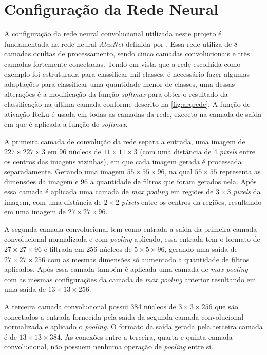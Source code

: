 


\section{Configuração da Rede Neural}

A configuração da rede neural convolucional utilizada neste projeto é fundamentada na rede neural \textit{AlexNet} definida por . Essa rede utiliza de 8 camadas ocultas de processamento, sendo cinco camadas convolucionais e três camadas fortemente conectadas. Tendo em vista que a rede escolhida como exemplo foi estruturada para classificar mil classes, é necessário fazer algumas adaptações para classificar uma quantidade menor de classes, uma dessas alterações é a modificação da função \textit{softmax} para obter o resultado da classificação na última camada conforme descrito na \autoref{fig:arqrede}. A função de ativação ReLu é usada em todas as camadas da rede, execeto na camada de saída em que é aplicada a função de \textit{softmax}.

\par A primeira camada de convolução da rede separa a entrada, uma imagem de $227\times227\times3$ em 96 núcleos de $11\times11\times3$ (com uma distância de 4 \textit{pixels} entre os centros das imagens vizinhas), em que cada imagem gerada é processada separadamente. 
Gerando uma imagem $55\times55\times96$, na qual $55\times55$ representa as dimensões da imagem e 96 a quantidade de filtros que foram gerados nela. Após essa camada é aplicada uma camada de \textit{max pooling} em regiões de $3\times3$ \textit{pixels} da imagem, com uma distância de $2\times2$ \textit{pixels} entre os centros da regiões, resultando em uma imagem de $27\times27\times96$.

\par A segunda camada convolucional tem como entrada a saída da primeira camada convolucional normalizada e com \textit{pooling} aplicado, essa entrada tem o formato de $27\times27\times96$ é filtrada em 256 núcleos de $5\times5\times96$, gerando uma saída de $27\times27\times256$ com as mesmas dimensões só aumentado a quantidade de filtros aplicados. Após essa camada também é aplicada uma camada de \textit{max pooling} com as mesmas configurações da camada de \textit{max pooling} anterior resultando em uma saída de $13\times13\times256$.

\par A terceira camada convolucional possui 384 núcleos de $3\times3\times256$ que são conectados a entrada fornecida pela saída da segunda camada convolucional normalizada e aplicado o \textit{pooling}. O formato da saída gerada pela terceira camada é de $13\times13\times384$. As conexões entre a terceira, quarta e quinta camada convolucional, não possuem nenhuma operação de \textit{pooling} entre si. 

